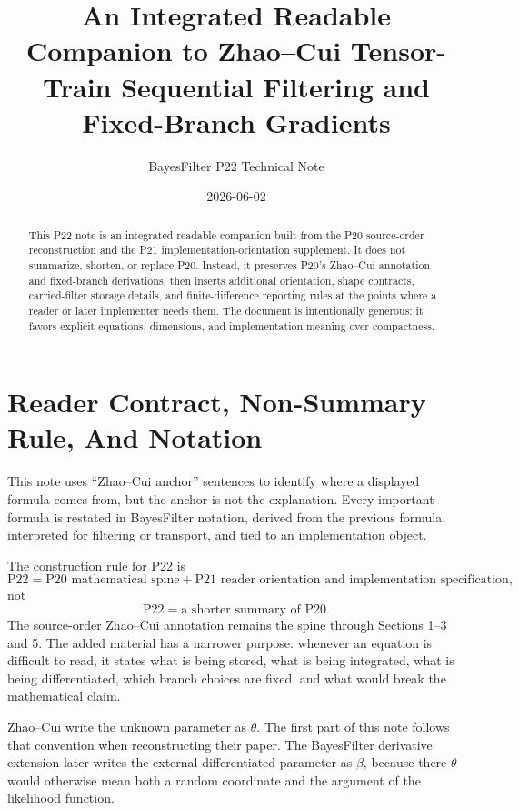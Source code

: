 \documentclass[11pt]{article}
\title{An Integrated Readable Companion to Zhao--Cui Tensor-Train Sequential Filtering and Fixed-Branch Gradients}
\author{BayesFilter P22 Technical Note}
\date{2026-06-02}
\begin{document}
\maketitle

\begin{abstract}
This P22 note is an integrated readable companion built from the P20
source-order reconstruction and the P21 implementation-orientation supplement.
It does not summarize, shorten, or replace P20.  Instead, it preserves P20's
Zhao--Cui annotation and fixed-branch derivations, then inserts additional
orientation, shape contracts, carried-filter storage details, and
finite-difference reporting rules at the points where a reader or later
implementer needs them.  The document is intentionally generous: it favors
explicit equations, dimensions, and implementation meaning over compactness.
\end{abstract}

\tableofcontents

\section{Reader Contract, Non-Summary Rule, And Notation}

This note uses ``Zhao--Cui anchor'' sentences to identify where a displayed
formula comes from, but the anchor is not the explanation.  Every important
formula is restated in BayesFilter notation, derived from the previous
formula, interpreted for filtering or transport, and tied to an implementation
object.

The construction rule for P22 is
\[
    \text{P22}
    =
    \text{P20 mathematical spine}
    +
    \text{P21 reader orientation and implementation specification},
    \tag{P22-C1}
\]
not
\[
    \text{P22}
    =
    \text{a shorter summary of P20}.
    \tag{P22-C2}
\]
The source-order Zhao--Cui annotation remains the spine through Sections
1--3 and 5.  The added material has a narrower purpose: whenever an equation
is difficult to read, it states what is being stored, what is being integrated,
what is being differentiated, which branch choices are fixed, and what would
break the mathematical claim.

Zhao--Cui write the unknown parameter as \(\theta\).  The first part of this
note follows that convention when reconstructing their paper.  The
BayesFilter derivative extension later writes the external differentiated
parameter as \(\beta\), because there \(\theta\) would otherwise mean both a
random coordinate and the argument of the likelihood function.
\end{document}
